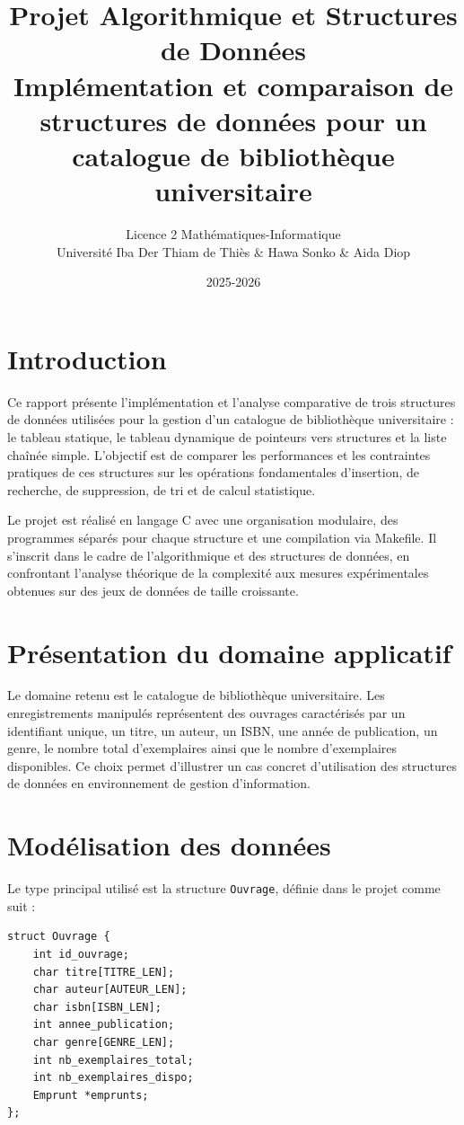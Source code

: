 \documentclass[12pt,a4paper]{article}
\title{Projet Algorithmique et Structures de Données\\
Implémentation et comparaison de structures de données pour un catalogue de bibliothèque universitaire}
\author{Licence 2 Mathématiques-Informatique\\Université Iba Der Thiam de Thiès & Hawa Sonko & Aida Diop}
\date{2025-2026}
\begin{document}
\maketitle

\tableofcontents
\newpage

\section{Introduction}
Ce rapport présente l’implémentation et l’analyse comparative de trois structures de données utilisées pour la gestion d’un catalogue de bibliothèque universitaire : le tableau statique, le tableau dynamique de pointeurs vers structures et la liste chaînée simple. L’objectif est de comparer les performances et les contraintes pratiques de ces structures sur les opérations fondamentales d’insertion, de recherche, de suppression, de tri et de calcul statistique.

Le projet est réalisé en langage C avec une organisation modulaire, des programmes séparés pour chaque structure et une compilation via Makefile. Il s’inscrit dans le cadre de l’algorithmique et des structures de données, en confrontant l’analyse théorique de la complexité aux mesures expérimentales obtenues sur des jeux de données de taille croissante.

\section{Présentation du domaine applicatif}
Le domaine retenu est le catalogue de bibliothèque universitaire. Les enregistrements manipulés représentent des ouvrages caractérisés par un identifiant unique, un titre, un auteur, un ISBN, une année de publication, un genre, le nombre total d’exemplaires ainsi que le nombre d’exemplaires disponibles. Ce choix permet d’illustrer un cas concret d’utilisation des structures de données en environnement de gestion d’information.

\section{Modélisation des données}
Le type principal utilisé est la structure \texttt{Ouvrage}, définie dans le projet comme suit :

\begin{verbatim}
struct Ouvrage {
    int id_ouvrage;
    char titre[TITRE_LEN];
    char auteur[AUTEUR_LEN];
    char isbn[ISBN_LEN];
    int annee_publication;
    char genre[GENRE_LEN];
    int nb_exemplaires_total;
    int nb_exemplaires_dispo;
    Emprunt *emprunts;
};
\end{verbatim}
\end{document}
